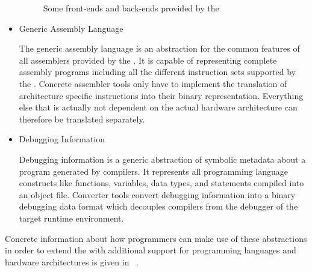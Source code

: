 \begin{itemize}
\begin{figure}
\caption{Some front-ends and back-ends provided by the \ecs{}}
\label{fig:introcode}
\end{figure}

\item Generic Assembly Language\nopagebreak

The generic assembly language is an abstraction for the common features of all assemblers provided by the \ecs{}.
It is capable of representing complete assembly programs including all the different instruction sets supported by the \ecs{}.
Concrete assembler tools only have to implement the translation of architecture specific instructions into their binary representation.
Everything else that is actually not dependent on the actual hardware architecture can therefore be translated separately.
\seeassembly

\item Debugging Information\nopagebreak

Debugging information is a generic abstraction of symbolic metadata about a program generated by compilers.
It represents all programming language constructs like functions, variables, data types, and statements compiled into an object file.
Converter tools convert debugging information into a binary debugging data format which decouples compilers from the debugger of the target runtime environment.
\seedebugging

\end{itemize}

Concrete information about how programmers can make use of these abstractions in order to extend the \ecs{} with additional support
for programming languages and hardware architectures is given in \Documentation{}~.

\concludechapter
